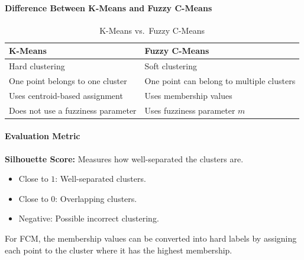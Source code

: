 \documentclass[a4paper,11pt]{article}
\begin{document}
\paragraph{Difference Between K-Means and Fuzzy C-Means}
\begin{table}[H]
\centering
\caption{K-Means vs.\ Fuzzy C-Means}
\begin{tabular}{ll}
\toprule
\textbf{K-Means} & \textbf{Fuzzy C-Means} \\
\midrule
Hard clustering                     & Soft clustering \\
One point belongs to one cluster    & One point can belong to multiple clusters \\
Uses centroid-based assignment      & Uses membership values \\
Does not use a fuzziness parameter  & Uses fuzziness parameter $m$ \\
\bottomrule
\end{tabular}
\end{table}

\paragraph{Evaluation Metric}
\textbf{Silhouette Score:} Measures how well-separated the clusters are.
\begin{itemize}
    \item Close to $1$: Well-separated clusters.
    \item Close to $0$: Overlapping clusters.
    \item Negative: Possible incorrect clustering.
\end{itemize}
For FCM, the membership values can be converted into hard labels by assigning each point to the cluster where it has the highest membership.
\end{document}
